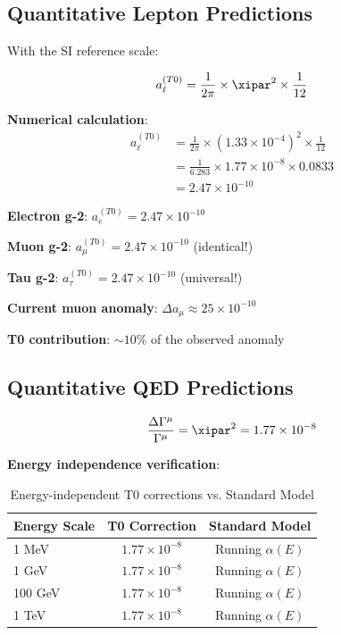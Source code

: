 	\subsection{Quantitative Lepton Predictions}
	
	With the SI reference scale:
	
	\begin{equation}
		a_{\ell}^{(T0)} = \frac{1}{2\pi} \times \xipar^2 \times \frac{1}{12}
		\label{eq:quantitative_lepton_correction}
	\end{equation}
	
	\textbf{Numerical calculation}:
	\begin{align}
		a_{\ell}^{(T0)} &= \frac{1}{2\pi} \times (1.33 \times 10^{-4})^2 \times \frac{1}{12} \\
		&= \frac{1}{6.283} \times 1.77 \times 10^{-8} \times 0.0833 \\
		&= 2.47 \times 10^{-10}
	\end{align}
	
	\begin{tcolorbox}[colback=blue!5!white,colframe=blue!75!black,title=Universal Lepton Prediction]
		\textbf{Electron g-2}: $a_e^{(T0)} = 2.47 \times 10^{-10}$
		
		\textbf{Muon g-2}: $a_{\mu}^{(T0)} = 2.47 \times 10^{-10}$ (identical!)
		
		\textbf{Tau g-2}: $a_{\tau}^{(T0)} = 2.47 \times 10^{-10}$ (universal!)
		
		\textbf{Current muon anomaly}: $\Delta a_{\mu} \approx 25 \times 10^{-10}$
		
		\textbf{T0 contribution}: $\sim 10\%$ of the observed anomaly
	\end{tcolorbox}
	
	\subsection{Quantitative QED Predictions}
	
	\begin{equation}
		\frac{\Delta\Gamma^{\mu}}{\Gamma^{\mu}} = \xipar^2 = 1.77 \times 10^{-8}
		\label{eq:quantitative_qed_correction}
	\end{equation}
	
	\textbf{Energy independence verification}:
	\begin{table}[htbp]
		\centering
		\begin{tabular}{lcc}
			\toprule
			\textbf{Energy Scale} & \textbf{T0 Correction} & \textbf{Standard Model} \\
			\midrule
			1 MeV & $1.77 \times 10^{-8}$ & Running $\alpha(E)$ \\
			1 GeV & $1.77 \times 10^{-8}$ & Running $\alpha(E)$ \\
			100 GeV & $1.77 \times 10^{-8}$ & Running $\alpha(E)$ \\
			1 TeV & $1.77 \times 10^{-8}$ & Running $\alpha(E)$ \\
			\bottomrule
		\end{tabular}
		\caption{Energy-independent T0 corrections vs. Standard Model}
	\end{table}
	
